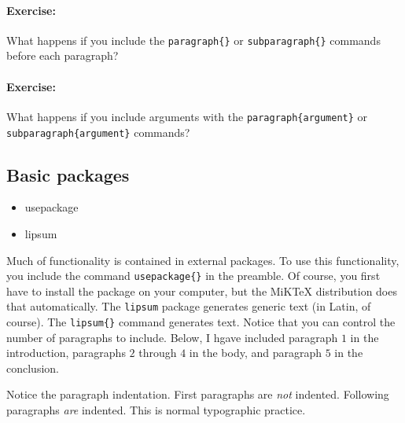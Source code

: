        \paragraph{Exercise:}What happens if you include the \texttt{paragraph\{\}} or \texttt{subparagraph\{\}} commands before each paragraph? 
        
        \paragraph{Exercise:}What happens if you include arguments with the \texttt{paragraph\{argument\}} or \texttt{subparagraph\{argument\}} commands? 

        \subsection{Basic packages}
        \label{Basic packages}
        
        \begin{framed}
            \begin{itemize}
                \item{usepackage}
                \item{lipsum}
            \end{itemize}
        \end{framed}

Much of \LaTeXe{} functionality is contained in external packages. To use this functionality, you include the command \texttt{usepackage\{\}} in the preamble. Of course, you first have to install the package on your computer, but the MiKTeX distribution does that automatically. The \texttt{lipsum} package generates generic text (in Latin, of course). The \texttt{lipsum\{\}} command generates text. Notice that you can control the number of paragraphs to include. Below, I hgave included paragraph $1$ in the introduction, paragraphs $2$ through $4$ in the body, and paragraph $5$ in the conclusion.

Notice the paragraph indentation. First paragraphs are \textit{not} indented. Following paragraphs \textit{are} indented. This is normal typographic practice.

